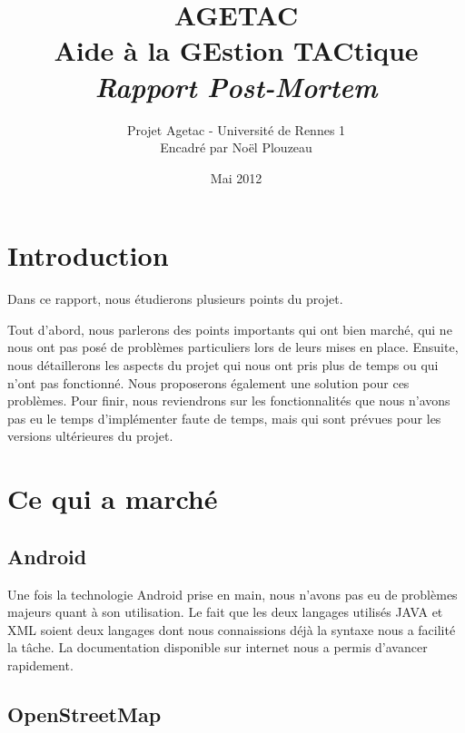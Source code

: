 \documentclass{article}
\title{\Huge{AGETAC\\
Aide à la GEstion TACtique\\}
\huge{{\color{color02} \textit{Rapport Post-Mortem}}}}
\date{Mai 2012}
\author{Projet Agetac - Université de Rennes 1\\
Encadré par Noël Plouzeau}
\begin{document}
\maketitle

%
%
%

\vspace{1.1in}
\tableofcontents
\newpage

\section{Introduction}

Dans ce rapport, nous étudierons plusieurs points du projet.

 Tout d'abord, nous parlerons des points importants qui ont bien 
marché, qui ne nous ont pas posé de problèmes particuliers lors de leurs mises 
en place. Ensuite, nous détaillerons les aspects du projet qui nous ont pris plus 
de temps ou qui n'ont pas fonctionné. Nous proposerons également une solution 
pour ces problèmes. Pour finir, nous reviendrons sur les fonctionnalités que 
nous n'avons pas eu le temps d'implémenter faute de temps, mais qui sont prévues 
pour les versions ultérieures du projet.

\section{Ce qui a marché }


\subsection{Android}

Une fois la technologie Android prise en main, nous n'avons pas 
eu de problèmes majeurs quant à son utilisation. Le fait que les deux langages 
utilisés JAVA et XML soient deux langages dont nous connaissions déjà la syntaxe 
nous a facilité la tâche. La documentation disponible sur internet nous a permis 
d'avancer rapidement.

\subsection{OpenStreetMap}
\end{document}
